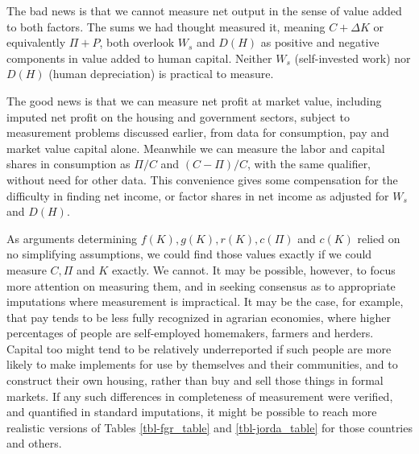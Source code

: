 
The bad news is that we cannot measure net output in the sense of value added to both factors. The sums we had thought measured it, meaning $C + \Delta K$ or equivalently $\Pi + P$, both overlook $W_s$ and $D(H)$ as positive and negative components in value added to human capital. Neither $W_s$ (self-invested work) nor $D(H)$ (human depreciation) is practical to measure.

The good news is that we can measure net profit at market value, including imputed net profit on the housing and government sectors, subject to measurement problems discussed earlier, from data for consumption, pay and market value capital alone. Meanwhile we can measure the labor and capital shares in consumption as $\Pi / C$ and $( C - \Pi ) / C$, with the same qualifier, without need for other data. This convenience gives some compensation for the difficulty in finding net income, or factor shares in net income as adjusted for $W_s$ and $D(H)$.

As arguments determining \(f(K), g(K), r(K), c(\Pi)\) and \(c(K)\) relied on no simplifying assumptions, we could find those values exactly if we could measure \(C, \Pi\) and \(K\) exactly. We cannot. It may be possible, however, to focus more attention on measuring them, and in seeking consensus as to appropriate imputations where measurement is impractical. It may be the case, for example, that pay tends to be less fully recognized in agrarian economies, where higher percentages of people are self-employed homemakers, farmers and herders. Capital too might tend to be relatively underreported if such people are more likely to make implements for use by themselves and their communities, and to construct their own housing, rather than buy and sell those things in formal markets. If any such differences in completeness of measurement were verified, and quantified in standard imputations, it might be possible to reach more realistic versions of Tables \ref{tbl-fgr_table} and \ref{tbl-jorda_table} for those countries and others.


%
%
\printcredits

% 








